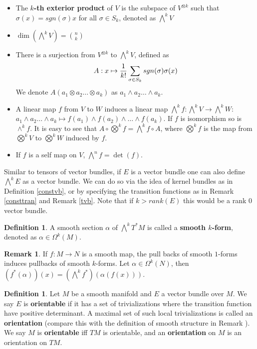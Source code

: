 \documentclass{article}
\theoremstyle{definition}
\newtheorem{dfn}[thm]{Definition}
\newtheorem{rmk}[thm]{Remark}
\begin{document}
\begin{itemize}
    \item The {\bf $k$-th exterior product} of $V$ is the subspace of $V^{\otimes k}$ such that $\sigma(x)=sgn(\sigma)x$ for all $\sigma\in S_k$, denoted as $\bigwedge^k V$
    \item $\dim(\bigwedge^k V)={n\choose k}$
    \item There is a surjection from $V^{\otimes k}$ to $\bigwedge^k V$, defined as
    \[A: x\mapsto {1\over k!}\sum_{\sigma\in S_k}sgn(\sigma)\sigma(x)\]
    We denote $A(a_1\otimes a_2\dots \otimes a_k)$ as $a_1\wedge a_2\dots \wedge a_k$.
    \item A linear map $f$ from $V$ to $W$ induces a linear map $\bigwedge^k f: \bigwedge^k V\rightarrow \bigwedge^k W$: $a_1\wedge a_2\dots \wedge a_k\mapsto f(a_1)\wedge f(a_2)\wedge\dots\wedge f(a_k)$. If $f$ is isomorphism so is $\wedge^k f$. It is easy to see that $A\circ \bigotimes^k f=\bigwedge^k f\circ A$, where $\bigotimes^k f$ is the map from $\bigotimes^k V$ to $\bigotimes^k W$ induced by $f$.
    \item If $f$ is a self map on $V$, $\bigwedge^n f=\det(f)$.
\end{itemize}

Similar to tensors of vector bundles, if $E$ is a vector bundle one can also define $\bigwedge^k E$ as a vector bundle. We can do so via the idea of kernel bundles as in Definition \ref{constvb}, or by specifying the transition functions as in Remark \ref{consttran} and Remark \ref{tvb}. Note that if $k>rank(E)$ this would be a rank $0$ vector bundle.

\begin{dfn}
    A smooth section $\alpha$ of $\bigwedge^k T^*M$ is called a {\bf smooth $k$-form}, denoted as $\alpha\in\Omega^k(M)$.
\end{dfn}

\begin{rmk}
    If $f: M\rightarrow N$ is a smooth map, the pull backs of smooth $1$-forms induces pullbacks of smooth $k$-forms. Let $\alpha\in \Omega^k(N)$, then $(f^*(\alpha))(x)=(\bigwedge^k f^*)(\alpha(f(x)))$.
\end{rmk}

\begin{dfn}
    Let $M$ be a smooth manifold and $E$ a vector bundle over $M$. We say $E$ is {\bf orientable} if it has a set of trivializations where the transition function have positive determinant. A maximal set of such local trivializations is called an {\bf orientation} (compare this with the definition of smooth structure in Remark \cite{ssts}). We say $M$ is {\bf orientable} iff $TM$ is orientable, and an {\bf orientation} on $M$ is an orientation on $TM$.
\end{dfn}
\end{document}
